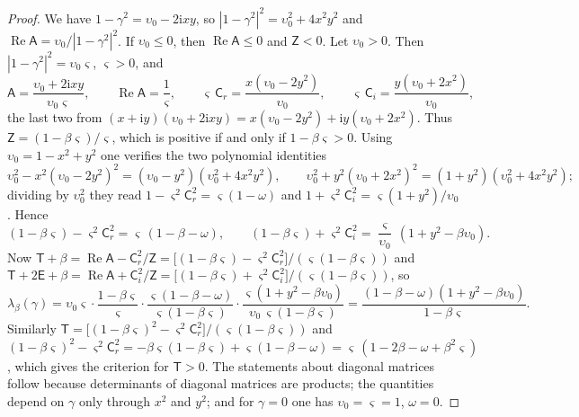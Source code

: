 \documentclass[11pt,reqno]{amsart}
\theoremstyle{definition}
\numberwithin{equation}{section}
\newcommand{\ii}{\mathrm{i}}
\newcommand{\sA}{\mathsf{A}}
\newcommand{\sC}{\mathsf{C}}
\newcommand{\sZ}{\mathsf{Z}}
\newcommand{\sT}{\mathsf{T}}
\newcommand{\sE}{\mathsf{E}}
\DeclareMathOperator{\RePart}{Re}
\begin{document}
\begin{proof}
We have $1-\gamma^2=\upsilon_0-2\ii xy$, so $|1-\gamma^2|^2=\upsilon_0^2+4x^2y^2$ and $\RePart\sA=\upsilon_0/|1-\gamma^2|^2$. If $\upsilon_0\le0$, then $\RePart\sA\le0$ and $\sZ<0$. Let $\upsilon_0>0$. Then $|1-\gamma^2|^2=\upsilon_0\varsigma$, $\varsigma>0$, and
\[
  \sA=\frac{\upsilon_0+2\ii xy}{\upsilon_0\varsigma},\qquad\RePart\sA=\frac1\varsigma,\qquad
  \varsigma\,\sC_r=\frac{x(\upsilon_0-2y^2)}{\upsilon_0},\qquad\varsigma\,\sC_i=\frac{y(\upsilon_0+2x^2)}{\upsilon_0},
\]
the last two from $(x+\ii y)(\upsilon_0+2\ii xy)=x(\upsilon_0-2y^2)+\ii y(\upsilon_0+2x^2)$. Thus $\sZ=(1-\beta\varsigma)/\varsigma$, which is positive if and only if $1-\beta\varsigma>0$. Using $\upsilon_0=1-x^2+y^2$ one verifies the two polynomial identities
\begin{equation}\label{eq:scalar-ids}
  \upsilon_0^2-x^2(\upsilon_0-2y^2)^2=(\upsilon_0-y^2)(\upsilon_0^2+4x^2y^2),\qquad
  \upsilon_0^2+y^2(\upsilon_0+2x^2)^2=(1+y^2)(\upsilon_0^2+4x^2y^2);
\end{equation}
dividing by $\upsilon_0^2$ they read $1-\varsigma^2\sC_r^2=\varsigma(1-\omega)$ and $1+\varsigma^2\sC_i^2=\varsigma(1+y^2)/\upsilon_0$. Hence
\[
  (1-\beta\varsigma)-\varsigma^2\sC_r^2=\varsigma\,(1-\beta-\omega),\qquad(1-\beta\varsigma)+\varsigma^2\sC_i^2=\frac{\varsigma}{\upsilon_0}\,(1+y^2-\beta\upsilon_0).
\]
Now $\sT+\beta=\RePart\sA-\sC_r^2/\sZ=\bigl[(1-\beta\varsigma)-\varsigma^2\sC_r^2\bigr]/(\varsigma(1-\beta\varsigma))$ and $\sT+2\sE+\beta=\RePart\sA+\sC_i^2/\sZ=\bigl[(1-\beta\varsigma)+\varsigma^2\sC_i^2\bigr]/(\varsigma(1-\beta\varsigma))$, so
\[
  \lambda_\beta(\gamma)=\upsilon_0\varsigma\cdot\frac{1-\beta\varsigma}{\varsigma}\cdot\frac{\varsigma(1-\beta-\omega)}{\varsigma(1-\beta\varsigma)}\cdot\frac{\varsigma(1+y^2-\beta\upsilon_0)}{\upsilon_0\,\varsigma(1-\beta\varsigma)}=\frac{(1-\beta-\omega)(1+y^2-\beta\upsilon_0)}{1-\beta\varsigma} .
\]
Similarly $\sT=\bigl[(1-\beta\varsigma)^2-\varsigma^2\sC_r^2\bigr]/(\varsigma(1-\beta\varsigma))$ and $(1-\beta\varsigma)^2-\varsigma^2\sC_r^2=-\beta\varsigma(1-\beta\varsigma)+\varsigma(1-\beta-\omega)=\varsigma\,(1-2\beta-\omega+\beta^2\varsigma)$, which gives the criterion for $\sT>0$. The statements about diagonal matrices follow because determinants of diagonal matrices are products; the quantities depend on $\gamma$ only through $x^2$ and $y^2$; and for $\gamma=0$ one has $\upsilon_0=\varsigma=1$, $\omega=0$.
\end{proof}
\end{document}
